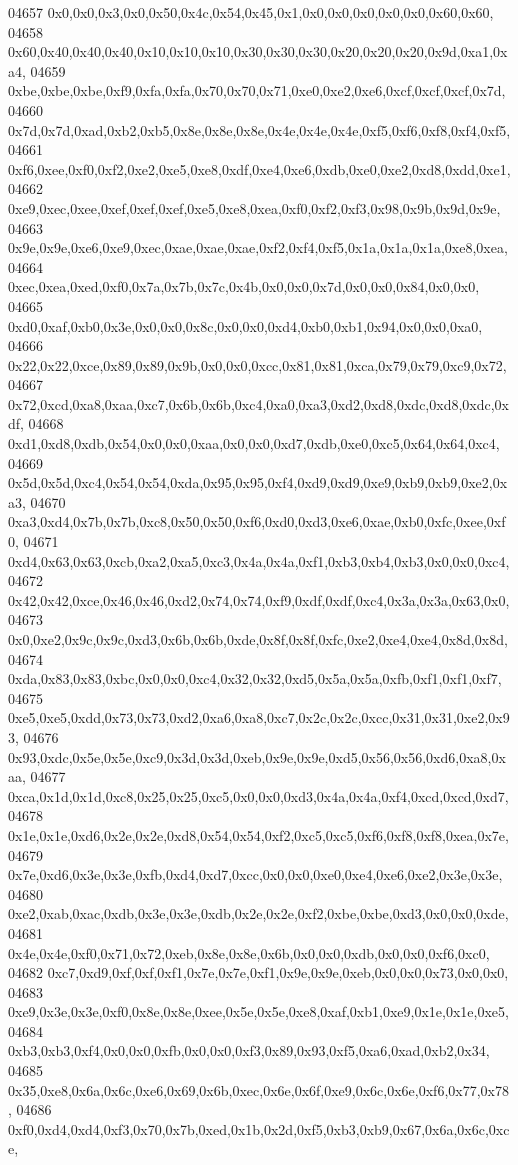 \begin{DoxyCode}
04657   0x0,0x0,0x3,0x0,0x50,0x4c,0x54,0x45,0x1,0x0,0x0,0x0,0x0,0x0,0x60,0x60,
04658   0x60,0x40,0x40,0x40,0x10,0x10,0x10,0x30,0x30,0x30,0x20,0x20,0x20,0x9d,0xa1,0xa4,
04659   0xbe,0xbe,0xbe,0xf9,0xfa,0xfa,0x70,0x70,0x71,0xe0,0xe2,0xe6,0xcf,0xcf,0xcf,0x7d,
04660   0x7d,0x7d,0xad,0xb2,0xb5,0x8e,0x8e,0x8e,0x4e,0x4e,0x4e,0xf5,0xf6,0xf8,0xf4,0xf5,
04661   0xf6,0xee,0xf0,0xf2,0xe2,0xe5,0xe8,0xdf,0xe4,0xe6,0xdb,0xe0,0xe2,0xd8,0xdd,0xe1,
04662   0xe9,0xec,0xee,0xef,0xef,0xef,0xe5,0xe8,0xea,0xf0,0xf2,0xf3,0x98,0x9b,0x9d,0x9e,
04663   0x9e,0x9e,0xe6,0xe9,0xec,0xae,0xae,0xae,0xf2,0xf4,0xf5,0x1a,0x1a,0x1a,0xe8,0xea,
04664   0xec,0xea,0xed,0xf0,0x7a,0x7b,0x7c,0x4b,0x0,0x0,0x7d,0x0,0x0,0x84,0x0,0x0,
04665   0xd0,0xaf,0xb0,0x3e,0x0,0x0,0x8c,0x0,0x0,0xd4,0xb0,0xb1,0x94,0x0,0x0,0xa0,
04666   0x22,0x22,0xce,0x89,0x89,0x9b,0x0,0x0,0xcc,0x81,0x81,0xca,0x79,0x79,0xc9,0x72,
04667   0x72,0xcd,0xa8,0xaa,0xc7,0x6b,0x6b,0xc4,0xa0,0xa3,0xd2,0xd8,0xdc,0xd8,0xdc,0xdf,
04668   0xd1,0xd8,0xdb,0x54,0x0,0x0,0xaa,0x0,0x0,0xd7,0xdb,0xe0,0xc5,0x64,0x64,0xc4,
04669   0x5d,0x5d,0xc4,0x54,0x54,0xda,0x95,0x95,0xf4,0xd9,0xd9,0xe9,0xb9,0xb9,0xe2,0xa3,
04670   0xa3,0xd4,0x7b,0x7b,0xc8,0x50,0x50,0xf6,0xd0,0xd3,0xe6,0xae,0xb0,0xfc,0xee,0xf0,
04671   0xd4,0x63,0x63,0xcb,0xa2,0xa5,0xc3,0x4a,0x4a,0xf1,0xb3,0xb4,0xb3,0x0,0x0,0xc4,
04672   0x42,0x42,0xce,0x46,0x46,0xd2,0x74,0x74,0xf9,0xdf,0xdf,0xc4,0x3a,0x3a,0x63,0x0,
04673   0x0,0xe2,0x9c,0x9c,0xd3,0x6b,0x6b,0xde,0x8f,0x8f,0xfc,0xe2,0xe4,0xe4,0x8d,0x8d,
04674   0xda,0x83,0x83,0xbc,0x0,0x0,0xc4,0x32,0x32,0xd5,0x5a,0x5a,0xfb,0xf1,0xf1,0xf7,
04675   0xe5,0xe5,0xdd,0x73,0x73,0xd2,0xa6,0xa8,0xc7,0x2c,0x2c,0xcc,0x31,0x31,0xe2,0x93,
04676   0x93,0xdc,0x5e,0x5e,0xc9,0x3d,0x3d,0xeb,0x9e,0x9e,0xd5,0x56,0x56,0xd6,0xa8,0xaa,
04677   0xca,0x1d,0x1d,0xc8,0x25,0x25,0xc5,0x0,0x0,0xd3,0x4a,0x4a,0xf4,0xcd,0xcd,0xd7,
04678   0x1e,0x1e,0xd6,0x2e,0x2e,0xd8,0x54,0x54,0xf2,0xc5,0xc5,0xf6,0xf8,0xf8,0xea,0x7e,
04679   0x7e,0xd6,0x3e,0x3e,0xfb,0xd4,0xd7,0xcc,0x0,0x0,0xe0,0xe4,0xe6,0xe2,0x3e,0x3e,
04680   0xe2,0xab,0xac,0xdb,0x3e,0x3e,0xdb,0x2e,0x2e,0xf2,0xbe,0xbe,0xd3,0x0,0x0,0xde,
04681   0x4e,0x4e,0xf0,0x71,0x72,0xeb,0x8e,0x8e,0x6b,0x0,0x0,0xdb,0x0,0x0,0xf6,0xc0,
04682   0xc7,0xd9,0xf,0xf,0xf1,0x7e,0x7e,0xf1,0x9e,0x9e,0xeb,0x0,0x0,0x73,0x0,0x0,
04683   0xe9,0x3e,0x3e,0xf0,0x8e,0x8e,0xee,0x5e,0x5e,0xe8,0xaf,0xb1,0xe9,0x1e,0x1e,0xe5,
04684   0xb3,0xb3,0xf4,0x0,0x0,0xfb,0x0,0x0,0xf3,0x89,0x93,0xf5,0xa6,0xad,0xb2,0x34,
04685   0x35,0xe8,0x6a,0x6c,0xe6,0x69,0x6b,0xec,0x6e,0x6f,0xe9,0x6c,0x6e,0xf6,0x77,0x78,
04686   0xf0,0xd4,0xd4,0xf3,0x70,0x7b,0xed,0x1b,0x2d,0xf5,0xb3,0xb9,0x67,0x6a,0x6c,0xce,

\end{DoxyCode}
